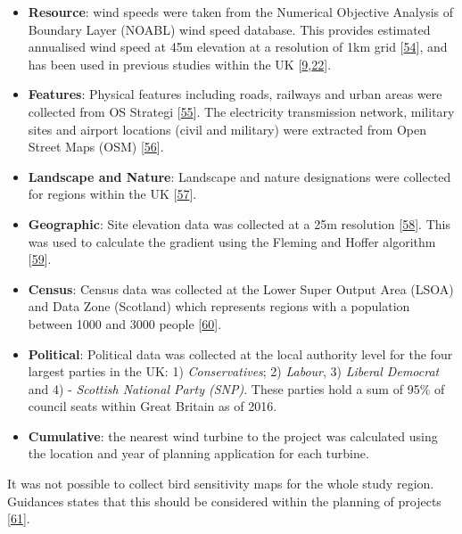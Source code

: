 \documentclass[a4paper,]{article}
\providecommand{\tightlist}{%
  \setlength{\itemsep}{0pt}\setlength{\parskip}{0pt}}
\theoremstyle{definition}
\theoremstyle{definition}
\theoremstyle{definition}
\theoremstyle{remark}
\begin{document}
\begin{itemize}
\tightlist
\item
  \textbf{Resource}: wind speeds were taken from the Numerical Objective
  Analysis of Boundary Layer (NOABL) wind speed database. This provides
  estimated annualised wind speed at 45m elevation at a resolution of
  1km grid {[}\protect\hyperlink{ref-DTI2001}{54}{]}, and has been used
  in previous studies within the UK
  {[}\protect\hyperlink{ref-Baban2001}{9},\protect\hyperlink{ref-Watson2015}{22}{]}.
\item
  \textbf{Features}: Physical features including roads, railways and
  urban areas were collected from OS Strategi
  {[}\protect\hyperlink{ref-Survey2016}{55}{]}. The electricity
  transmission network, military sites and airport locations (civil and
  military) were extracted from Open Street Maps (OSM)
  {[}\protect\hyperlink{ref-Overpass2016}{56}{]}.
\item
  \textbf{Landscape and Nature}: Landscape and nature designations were
  collected for regions within the UK
  {[}\protect\hyperlink{ref-Pope2017}{57}{]}.
\item
  \textbf{Geographic}: Site elevation data was collected at a 25m
  resolution {[}\protect\hyperlink{ref-Commission2015}{58}{]}. This was
  used to calculate the gradient using the Fleming and Hoffer algorithm
  {[}\protect\hyperlink{ref-Fleming1979}{59}{]}.
\item
  \textbf{Census}: Census data was collected at the Lower Super Output
  Area (LSOA) and Data Zone (Scotland) which represents regions with a
  population between 1000 and 3000 people
  {[}\protect\hyperlink{ref-OfficeforNationalStatistics}{60}{]}.\\
\item
  \textbf{Political}: Political data was collected at the local
  authority level for the four largest parties in the UK: 1)
  \emph{Conservatives}; 2) \emph{Labour}, 3) \emph{Liberal Democrat} and
  4) - \emph{Scottish National Party (SNP)}. These parties hold a sum of
  95\% of council seats within Great Britain as of 2016.
\item
  \textbf{Cumulative}: the nearest wind turbine to the project was
  calculated using the location and year of planning application for
  each turbine.
\end{itemize}

It was not possible to collect bird sensitivity maps for the whole study
region. Guidances states that this should be considered within the
planning of projects {[}\protect\hyperlink{ref-Gove2013}{61}{]}.
\end{document}
